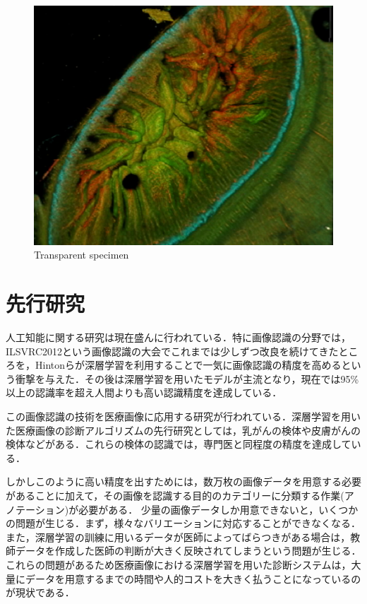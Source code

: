 \begin{figure}[H]
\begin{minipage}[b]{0.4\columnwidth}
		\includegraphics[clip, width=\linewidth]{fig/chapter1/colon_microscope}
	\end{minipage}
	\caption{Transparent specimen}
	\label{fig:lucid}
\end{figure}


\section{先行研究}\label{sec:先行研究}
人工知能に関する研究は現在盛んに行われている\cite{lecun2015deep, hoo2016deep}．特に画像認識の分野では，ILSVRC2012という画像認識の大会でこれまでは少しずつ改良を続けてきたところを，Hintonらが深層学習を利用することで一気に画像認識の精度を高めるという衝撃を与えた\cite{AlexNet}．その後は深層学習を用いたモデルが主流となり，現在では95\%以上の認識率を超え人間よりも高い認識精度を達成している\cite{ResNet}．

この画像認識の技術を医療画像に応用する研究が行われている\cite{inglese2017deep, hoo2016deep, havaei2017brain}．深層学習を用いた医療画像の診断アルゴリズムの先行研究としては，乳がん\cite{wang2016deep}の検体や皮膚がん\cite{esteva2017dermatologist}の検体などがある．これらの検体の認識では，専門医と同程度の精度を達成している．

しかしこのように高い精度を出すためには，数万枚の画像データを用意する必要があることに加えて，その画像を認識する目的のカテゴリーに分類する作業(アノテーション)が必要がある．
少量の画像データしか用意できないと，いくつかの問題が生じる．まず，様々なバリエーションに対応することができなくなる．また，深層学習の訓練に用いるデータが医師によってばらつきがある場合は，教師データを作成した医師の判断が大きく反映されてしまうという問題が生じる．これらの問題があるため医療画像における深層学習を用いた診断システムは，大量にデータを用意するまでの時間や人的コストを大きく払うことになっているのが現状である．

